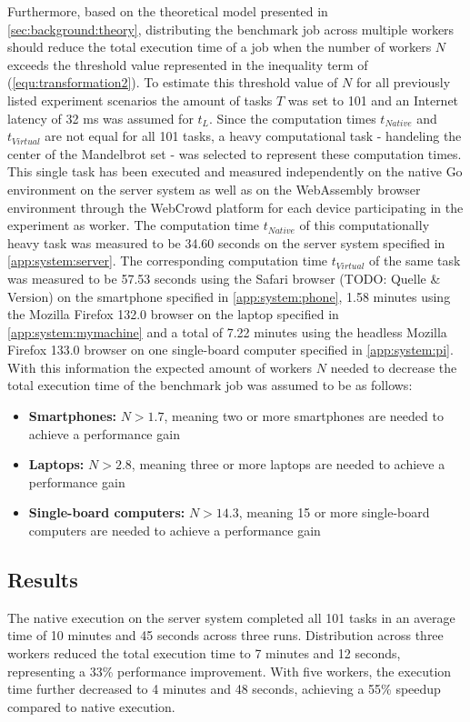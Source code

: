 Furthermore, based on the theoretical model presented in \autoref{sec:background:theory}, distributing the benchmark job across multiple workers should reduce the total execution time of a job when the number of workers $N$ exceeds the threshold value represented in the inequality term of (\eqref{equ:transformation2}). To estimate this threshold value of $N$ for all previously listed experiment scenarios the amount of tasks $T$ was set to 101 and an Internet latency of 32 ms \cite{backend:latency} was assumed for $t_{L}$. Since the computation times $t_{Native}$ and $t_{Virtual}$ are not equal for all 101 tasks, a heavy computational task - handeling the center of the Mandelbrot set - was selected to represent these computation times. This single task has been executed and measured independently on the native Go environment on the server system as well as on the WebAssembly browser environment through the WebCrowd platform for each device participating in the experiment as worker. The computation time $t_{Native}$ of this computationally heavy task was measured to be 34.60 seconds on the server system specified in \autoref{app:system:server}. The corresponding computation time $t_{Virtual}$ of the same task was measured to be 57.53 seconds using the Safari browser (TODO: Quelle \& Version) on the smartphone specified in \autoref{app:system:phone}, 1.58 minutes using the Mozilla Firefox 132.0 \cite{background:firefox} browser on the laptop specified in \autoref{app:system:mymachine} and a total of 7.22 minutes using the headless Mozilla Firefox 133.0 \cite{background:firefox2} browser on one single-board computer specified in \autoref{app:system:pi}. With this information the expected amount of workers $N$ needed to decrease the total execution time of the benchmark job was assumed to be as follows:
\begin{itemize}
    \item \textbf{Smartphones:} $N > 1.7$, meaning two or more smartphones are needed to achieve a performance gain 
    \item \textbf{Laptops:} $N > 2.8$, meaning three or more laptops are needed to achieve a performance gain
    \item \textbf{Single-board computers:} $N > 14.3$, meaning 15 or more single-board computers are needed to achieve a performance gain
\end{itemize}

\subsection{Results}
The native execution on the server system completed all 101 tasks in an average time of 10 minutes and 45 seconds across three runs. Distribution across three workers reduced the total execution time to 7 minutes and 12 seconds, representing a 33\% performance improvement. With five workers, the execution time further decreased to 4 minutes and 48 seconds, achieving a 55\% speedup compared to native execution.

